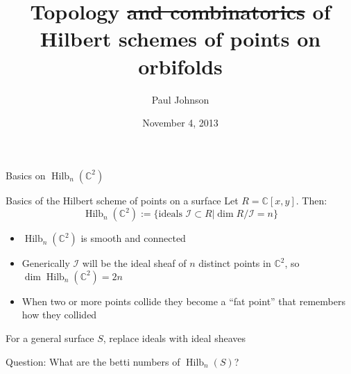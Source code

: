 \documentclass{beamer}
\DeclareMathOperator{\Hilb}{Hilb}
\newcommand{\C}{\mathbb{C}}
\begin{document}
\title{Topology \sout{and combinatorics} of Hilbert schemes of points on orbifolds}
\author{Paul Johnson}
\date{November 4, 2013}



\newcommand{\stepright}[2]{%
\begin{scope}[xshift=#1cm,yshift=#2cm]
\clip (-.5, -.5)-- ++(1,1) -- ++(1,0) -- ++ (-1,-1) -- ++(-1,0);
\draw[cap=rect] (0,0)--(1,0);
\end{scope}
}
\newcommand{\stepdown}[2]{%
\begin{scope}[xshift=#1cm,yshift=#2cm]
\clip (-.5, -.5)-- ++(1,1) -- ++(0,-1) -- ++ (-1,-1) -- ++(0,1);
\draw[cap=rect] (0,0)--(0,-1);
\end{scope}
}




\begin{frame}[plain]
  \titlepage
\end{frame}


\begin{frame}[plain,c]

\begin{center}

\Huge

Basics on $\Hilb_n(\C^2)$

\end{center}

\end{frame}




\begin{frame}{Basics of the Hilbert scheme of points on a surface}
Let $R=\C[x,y]$.  Then:
$$\Hilb_n(\C^2):=\{\textrm{ideals }\mathcal{I}\subset R | \dim R/\mathcal{I}=n\}$$ 
\begin{itemize}
\item $\Hilb_n(\C^2)$ is smooth and connected 
\item Generically $\mathcal{I}$ will be the ideal sheaf of $n$ distinct points in $\C^2$, so $\dim \Hilb_n(\C^2)=2n$
\item When two or more points collide they become a ``fat point'' that remembers how they collided
\end{itemize}
For a general surface $S$, replace ideals with ideal sheaves

\begin{block}{Question: What are the betti numbers of $\Hilb_n(S)$?}
  
\end{block}

\end{frame}
\end{document}
